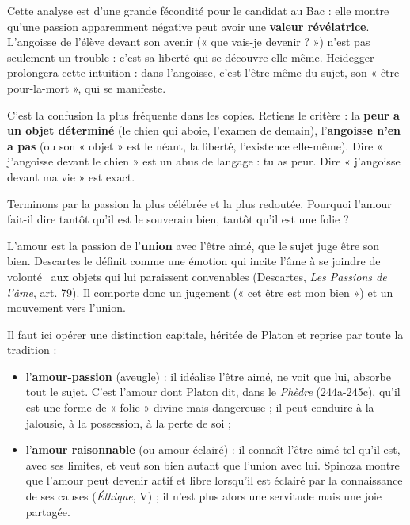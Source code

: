\documentclass[11pt]{article}
\newcommand{\cle}[1]{{\popxbold\color{popdark}#1}}
\newcounter{popsec}
\newcounter{popsub}
\newcommand{\courssub}[1]{%
  \stepcounter{popsub}%
  \par\vspace{9pt}\noindent{\popxbold\fontsize{11.5}{13}\selectfont\color{popink}{\color{poporange}\thepopsec.\thepopsub}\hspace{6pt}#1}\par\nopagebreak\vspace{4pt}
}
\begin{document}
Cette analyse est d'une grande fécondité pour le candidat au Bac : elle montre qu'une passion apparemment négative peut avoir une \textbf{valeur révélatrice}. L'angoisse de l'élève devant son avenir (« que vais-je devenir ? ») n'est pas seulement un trouble : c'est sa liberté qui se découvre elle-même. Heidegger prolongera cette intuition : dans l'angoisse, c'est l'être même du sujet, son « être-pour-la-mort », qui se manifeste.

\begin{attention}
C'est la confusion la plus fréquente dans les copies. Retiens le critère : la \textbf{peur a un objet déterminé} (le chien qui aboie, l'examen de demain), l'\textbf{angoisse n'en a pas} (ou son « objet » est le néant, la liberté, l'existence elle-même). Dire « j'angoisse devant le chien » est un abus de langage : tu as peur. Dire « j'angoisse devant ma vie » est exact.
\end{attention}

\courssub{L'amour : la passion de l'union}

Terminons par la passion la plus célébrée et la plus redoutée. Pourquoi l'amour fait-il dire tantôt qu'il est le souverain bien, tantôt qu'il est une folie ?

\begin{definition}[L'amour]
L'\cle{amour} est la passion de l'\textbf{union} avec l'être aimé, que le sujet juge être son bien. Descartes le définit comme une émotion qui incite l'âme à \guillemotleft se joindre de volonté \guillemotright\ aux objets qui lui paraissent convenables (Descartes, \emph{Les Passions de l'âme}, art. 79). Il comporte donc un jugement (« cet être est mon bien ») et un mouvement vers l'union.
\end{definition}

Il faut ici opérer une distinction capitale, héritée de Platon et reprise par toute la tradition :

\begin{itemize}
\item l'\textbf{amour-passion} (aveugle) : il idéalise l'être aimé, ne voit que lui, absorbe tout le sujet. C'est l'amour dont Platon dit, dans le \emph{Phèdre} (244a-245c), qu'il est une forme de « folie » divine mais dangereuse ; il peut conduire à la jalousie, à la possession, à la perte de soi ;
\item l'\textbf{amour raisonnable} (ou amour éclairé) : il connaît l'être aimé tel qu'il est, avec ses limites, et veut son bien autant que l'union avec lui. Spinoza montre que l'amour peut devenir actif et libre lorsqu'il est éclairé par la connaissance de ses causes (\emph{Éthique}, V) ; il n'est plus alors une servitude mais une joie partagée.
\end{itemize}
\end{document}
